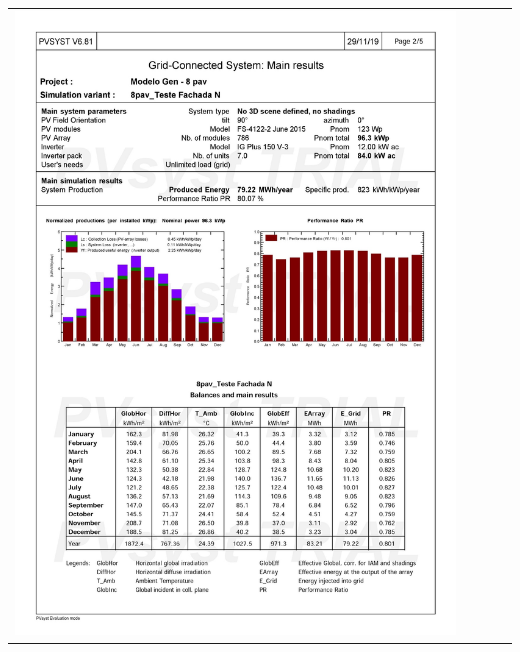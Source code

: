 \begin{table}[H]
    \centering
    \begin{tabular}{l}
        \includegraphics[width=0.9\textwidth]{figures/attachments/resultpv6.jpg}
    \end{tabular}
\end{table}
\pagebreak
